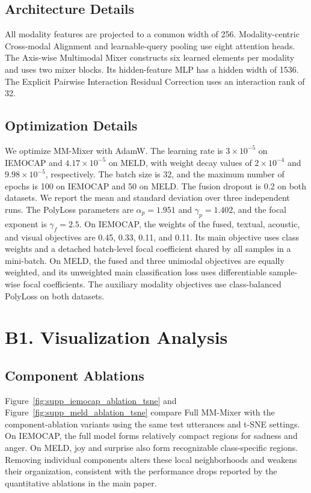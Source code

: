 \documentclass[letterpaper]{article} %
\begin{document}
\subsection{Architecture Details}
All modality features are projected to a common width of 256.
Modality-centric Cross-modal Alignment and learnable-query pooling use
eight attention heads. The Axis-wise Multimodal Mixer constructs six
learned elements per modality and uses two mixer blocks. Its
hidden-feature MLP has a hidden width of 1536. The Explicit Pairwise
Interaction Residual Correction uses an interaction rank of 32.

\subsection{Optimization Details}
We optimize MM-Mixer with AdamW. The learning rate is
$3\times10^{-5}$ on IEMOCAP and $4.17\times10^{-5}$ on MELD, with
weight decay values of $2\times10^{-4}$ and $9.98\times10^{-5}$,
respectively. The batch size is 32, and the maximum number of epochs
is 100 on IEMOCAP and 50 on MELD. The fusion dropout is 0.2 on both
datasets. We report the mean and standard deviation over three
independent runs.
The PolyLoss parameters are $\alpha_p=1.951$ and
$\gamma_p=1.402$, and the focal exponent is $\gamma_f=2.5$. On
IEMOCAP, the weights of the fused, textual, acoustic, and visual
objectives are 0.45, 0.33, 0.11, and 0.11. Its main objective uses
class weights and a detached batch-level focal coefficient shared by
all samples in a mini-batch. On MELD, the fused and three unimodal
objectives are equally weighted, and its unweighted main
classification loss uses differentiable sample-wise focal
coefficients. The auxiliary modality objectives use class-balanced
PolyLoss on both datasets.


\section{B1. Visualization Analysis}

\subsection{Component Ablations}
Figure~\ref{fig:supp_iemocap_ablation_tsne}
and Figure~\ref{fig:supp_meld_ablation_tsne} compare Full MM-Mixer with the
component-ablation variants using the same test utterances and t-SNE
settings. On IEMOCAP, the full model forms relatively compact regions
for sadness and anger. On MELD, joy and surprise also form recognizable
class-specific regions. Removing individual components alters these
local neighborhoods and weakens their organization, consistent with the
performance drops reported by the quantitative ablations in the main
paper.
\end{document}
